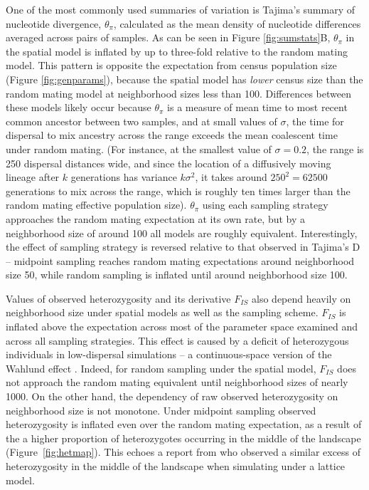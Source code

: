 \documentclass[10pt,twoside,lineno,hidelinks]{preprint}
\begin{document}
One of the most commonly used summaries of variation is Tajima's summary of nucleotide divergence, $\theta_{\pi}$, calculated as the mean density of nucleotide differences averaged across pairs of samples. As can be seen in Figure \ref{fig:sumstats}B, $\theta_{\pi}$ in the spatial model is inflated by up to three-fold relative to the random mating model. This pattern is opposite the expectation from census population size (Figure \ref{fig:genparams}), because the spatial model has \emph{lower} census size than the random mating model at neighborhood sizes less than 100. Differences between these models likely occur because $\theta_{\pi}$ is a measure of mean time to most recent common ancestor between two samples, and at small values of $\sigma$, the time for dispersal to mix ancestry across the range exceeds the mean coalescent time under random mating. (For instance, at the smallest value of $\sigma=0.2$, the range is 250 dispersal distances wide, and since the location of a diffusively moving lineage after $k$ generations has variance $k \sigma^2$, it takes around $250^2 = 62500$ generations to mix across the range, which is roughly ten times larger than the random mating effective population size). $\theta_{\pi}$ using each sampling strategy approaches the random mating expectation at its own rate, but by a neighborhood size of around 100 all models are roughly equivalent. Interestingly, the effect of sampling strategy is reversed relative to that observed in Tajima's D -- midpoint sampling reaches random mating expectations around neighborhood size 50, while random sampling is inflated until around neighborhood size 100. 

Values of observed heterozygosity and its derivative $F_{IS}$ also depend heavily on neighborhood size under spatial models as well as the sampling scheme. $F_{IS}$ is inflated above the expectation across most of the parameter space examined and across all sampling strategies. This effect is caused by a deficit of heterozygous individuals in low-dispersal simulations -- a continuous-space version of the Wahlund effect \citep{Wahlund1928}. Indeed, for random sampling under the spatial model, $F_{IS}$ does not approach the random mating equivalent until neighborhood sizes of nearly 1000. On the other hand, the dependency of raw observed heterozygosity on neighborhood size is not monotone. Under midpoint sampling observed heterozygosity is inflated even over the random mating expectation, as a result of the a higher proportion of heterozygotes occurring in the middle of the landscape (Figure~\ref{fig:hetmap}). This echoes a report from \citet{Shirk2014} who observed a similar excess of heterozygosity in the middle of the landscape when simulating under a lattice model.
\end{document}
